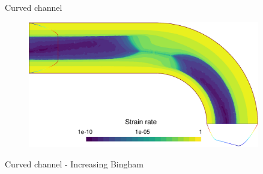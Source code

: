 \documentclass{beamer}  %
\begin{document}
\begin{frame}{Curved channel}
    \begin{figure}
        \centering
        \includegraphics[width=0.9\textwidth]{../figures/pipe_strain_v2.pdf}
    \end{figure}
\end{frame}

\begin{frame}{Curved channel - Increasing Bingham}
    \begin{figure}
    \end{figure}
\end{frame}
\end{document}
